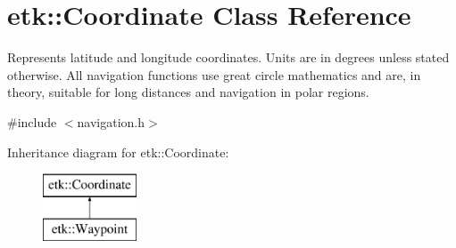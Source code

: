 \hypertarget{classetk_1_1_coordinate}{\section{etk\-:\-:Coordinate Class Reference}
\label{classetk_1_1_coordinate}
}


Represents latitude and longitude coordinates. Units are in degrees unless stated otherwise. All navigation functions use great circle mathematics and are, in theory, suitable for long distances and navigation in polar regions.  




{\ttfamily \#include $<$navigation.\-h$>$}

Inheritance diagram for etk\-:\-:Coordinate\-:\begin{figure}[H]
\begin{center}
\leavevmode
\includegraphics[height=2.000000cm]{classetk_1_1_coordinate}
\end{center}
\end{figure}
